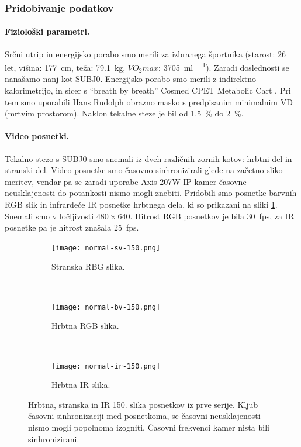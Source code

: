 \subsubsection{Pridobivanje podatkov}
\paragraph{Fiziolo\v{s}ki parametri.}
Srčni utrip in energijsko porabo smo merili za izbranega športnika (starost: 26 let, višina: \SI{177}{\cm}, teža: \SI{79.1}{\kg}, $VO_2max$: \SI{3705}{\ml\per\min}). Zaradi doslednosti se nanašamo nanj kot SUBJ0. Energijsko porabo smo merili z indirektno kalorimetrijo, in sicer s ``breath by breath'' Cosmed CPET Metabolic Cart \cite{beaver1973line}. Pri tem smo uporabili Hans Rudolph obrazno masko s predpisanim minimalnim VD (mrtvim prostorom). Naklon tekalne steze je bil od \SI{1.5}{\%} do \SI{2}{\%}.

\paragraph{Video posnetki.}
Tekalno stezo s SUBJ0 smo snemali iz dveh različnih zornih kotov: hrbtni del in stranski del. Video posnetke smo časovno sinhronizirali glede na začetno sliko meritev, vendar pa se zaradi uporabe Axis 207W IP kamer časovne neusklajenosti do potankosti nismo mogli znebiti. Pridobili smo posnetke barvnih RGB slik in infrardeče IR posnetke hrbtnega dela, ki so prikazani na sliki \ref{fig:primer-posnetka-rgb-ir}. Snemali smo v ločljivosti $480 \times 640$. Hitrost RGB posnetkov je bila \SI{30}{fps}, za IR posnetke pa je hitrost znašala \SI{25}{fps}.  

\begin{figure}[htb]
	\centering
	\begin{subfigure}[t]{0.3\columnwidth}
		\centering
		\texttt{[image: normal-sv-150.png]}
		\caption{Stranska RBG slika.}
	\end{subfigure}
	~
	\begin{subfigure}[t]{0.3\columnwidth}
		\centering
		\texttt{[image: normal-bv-150.png]}
		\caption{Hrbtna RGB slika.}
	\end{subfigure}
	~
    \begin{subfigure}[t]{0.3\columnwidth}
    	\centering
		\texttt{[image: normal-ir-150.png]}
		\caption{Hrbtna IR slika.}
	\end{subfigure}
	\caption[Hrbtna, stranska in IR 150. slika posnetkov iz prve serije]{Hrbtna, stranska in IR 150. slika posnetkov iz prve serije. Kljub časovni sinhronizaciji med posnetkoma, se časovni neusklajenosti nismo mogli popolnoma izogniti. Časovni frekvenci kamer nista bili sinhronizirani.}
	\label{fig:primer-posnetka-rgb-ir}
\end{figure}


